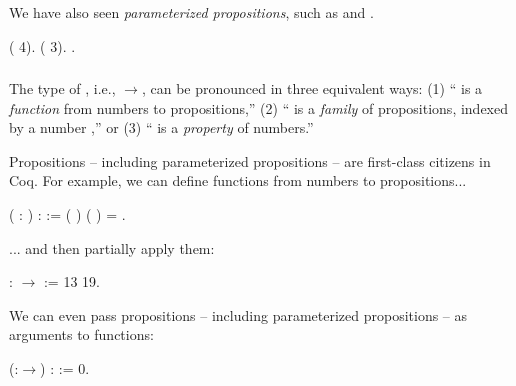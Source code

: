 \documentclass[12pt]{report}
\begin{document}
\subsubsection{ }

 We have also seen \textit{parameterized propositions}, such as  and
    . \begin{coqdoccode}
\coqdocemptyline
\coqdocnoindent
{} ( 4).\coqdoceol
\coqdocnoindent
{} ( 3).\coqdoceol
\coqdocnoindent
{} .\coqdoceol
\coqdocemptyline
\end{coqdoccode}
\subsubsection{ }

 The type of , i.e., \ensuremath{\rightarrow}, can be pronounced in
    three equivalent ways: (1) `` is a \textit{function} from numbers to
    propositions,'' (2) `` is a \textit{family} of propositions, indexed
    by a number ,'' or (3) `` is a \textit{property} of numbers.''  

 Propositions -- including parameterized propositions -- are
    first-class citizens in Coq.  For example, we can define functions
    from numbers to propositions... \begin{coqdoccode}
\coqdocemptyline
\coqdocnoindent
{}  (  : ) :  :=\coqdoceol
\coqdocindent{1.00em}
 (  ) (  ) = .\coqdoceol
\coqdocemptyline
\end{coqdoccode}
... and then partially apply them: \begin{coqdoccode}
\coqdocemptyline
\coqdocnoindent
{}  : \ensuremath{\rightarrow} :=  13 19.\coqdoceol
\coqdocemptyline
\end{coqdoccode}
We can even pass propositions -- including parameterized
    propositions -- as arguments to functions: \begin{coqdoccode}
\coqdocemptyline
\coqdocnoindent
{}  (:\ensuremath{\rightarrow}) :  :=\coqdoceol
\coqdocindent{1.00em}
 0.\coqdoceol
\coqdocemptyline
\end{coqdoccode}
\end{document}
